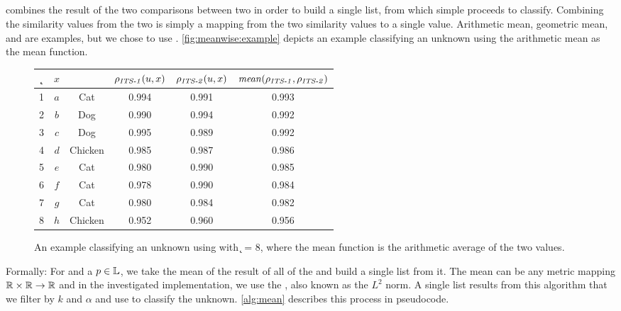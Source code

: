 

\subsection{\rmean{}}
\rmean{} combines the result of the two comparisons between two \isols{} in order to build a single \knnlong{} list, from which simple \kNN{} proceeds to classify.
Combining the similarity values from the two \compfuncs{} is simply a mapping from the two similarity values to a single value.
Arithmetic mean, geometric mean, and \euclid{} are examples, but we chose to use \euclid{}.
\autoref{fig:meanwise:example} depicts an example classifying an unknown \isol{} \UNKNOWN{} using the arithmetic mean as the mean function.

\begin{figure}
\centering
\begin{tabular}{c|c|c|c|c|c}
    \k{} & \Isol{} $x$ & \Spec{} & $\rho{}_{\text{\textit{\textit{ITS}{}-1}{}}}(u,x)$ & $\rho{}_{\text{\textit{\textit{ITS}{}-2}{}}}{}(u,x)$ & $\mathit{mean}(\rho{}_{\text{\textit{\textit{ITS}{}-1}{}}}{}, \rho{}_{\text{\textit{\textit{ITS}{}-2}{}}}{})$  \\ \hline\hline
    1 & $a$ & Cat       & 0.994 & 0.991 &  0.993 \\ \hline
    2 & $b$ & Dog       & 0.990 & 0.994 &  0.992 \\ \hline
    3 & $c$ & Dog       & 0.995 & 0.989 &  0.992 \\ \hline
    4 & $d$ & Chicken   & 0.985 & 0.987 &  0.986 \\ \hline
    5 & $e$ & Cat       & 0.980 & 0.990 &  0.985 \\ \hline
    6 & $f$ & Cat       & 0.978 & 0.990 &  0.984 \\ \hline
    7 & $g$ & Cat       & 0.980 & 0.984 &  0.982 \\ \hline
    8 & $h$ & Chicken   & 0.952 & 0.960 &  0.956 \\ \hline
\end{tabular}
\caption{An example classifying an unknown \isol{} \UNKNOWN{} using \rmean{} with \k{} = 8, where the mean function is the arithmetic average of the two \pcfunclabel{} values.}
\label{fig:meanwise:example}
\end{figure}

Formally: For \UNKNOWN{} and a $p\in\mathbb{L}{}$, we take the mean of the result of all of the \compfuncs{} and build a single \knnlong{} list from it.
The mean can be any metric mapping $\mathbb{R}\times\mathbb{R}\rightarrow\mathbb{R}$ and in the investigated implementation, we use the \euclid{}, also known as the $L^2$ norm.
A single \knnlong{} list results from this algorithm that we filter by $k$ and $\alpha$ and use to classify the unknown.
\autoref{alg:mean} describes this process in pseudocode.


